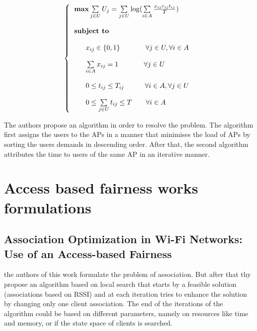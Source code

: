 \documentclass[journal,transmag]{IEEEtran}
\begin{document}
\begin{footnotesize}
\begin{equation}
\left\{
\begin{tabular}{l} 
$\textbf{max}  \sum\limits_{j \in U} U_j = \sum\limits_{j \in U} \log (\sum\limits_{i \in A} \frac{ x_{ij} r_{ij} t_{ij}}{T} ) $ \\         
\\
\textbf{subject to} \\

\\
~~~~~$ x_{ij} \in \{0,1 \} $ ~~~~~~~~~ $\forall j \in U,  \forall i \in A $  \\

\\
~~~~~$ \sum\limits_{i \in A} x_{ij} = 1 $ ~~~~~~~~~ $\forall j \in U $  \\

\\
~~~~~$ 0\leq t_{ij} \leq T_{ij} ~~~~~~~~~ \forall i \in A, \forall j \in U  $ \\ 

\\
~~~~~$  0 \leq \sum\limits_{j \in U} t_{ij} \leq T  ~~~~~~ \forall i \in A  $ \\

\end{tabular}
\right.
\end{equation}
\end{footnotesize}

The authors propose an algorithm in order to resolve the problem. The algorithm first assigns the users to the APs in a manner that minimises the load of APs by sorting the users demands in descending order. After that, the second algorithm attributes the time to users of the same AP in an iterative manner. 

\section{Access based fairness works formulations}
\subsection{Association Optimization in Wi-Fi Networks: Use of an Access-based Fairness \cite{16AP_association_optimisation_fairness}}
the authors of this work formulate the problem of association. But after that thy propose an algorithm based on local search that starts by a feasible solution (associations based on RSSI) and at each iteration tries to enhance the solution by changing only one client association. The end of the iterations of the algorithm could be based on different parameters, namely on resources like time and memory, or if the state space of clients is searched. \\ 
\end{document}
